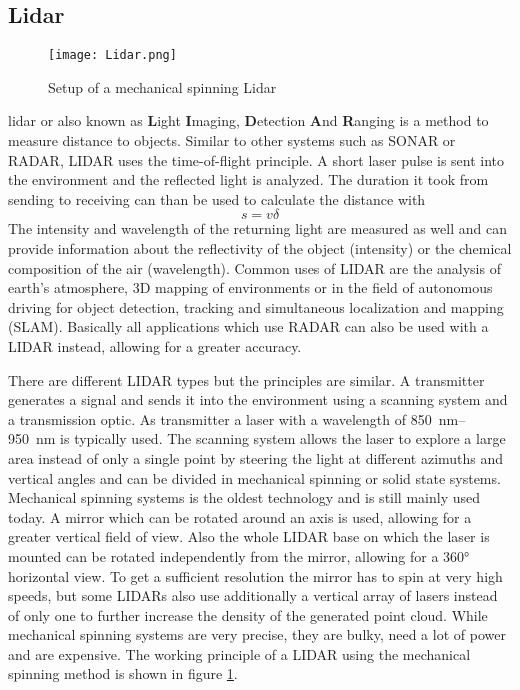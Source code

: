 \subsection{Lidar}
\begin{figure}[htb]
	\centering
	\texttt{[image: Lidar.png]}
	\caption{Setup of a mechanical spinning Lidar \cite{Li2020}}
	\label{fig:lidar}
\end{figure}
\gls{lidar} or also known as \textbf{L}ight \textbf{I}maging, \textbf{D}etection \textbf{A}nd \textbf{R}anging is a method to measure distance to objects.
Similar to other systems such as SONAR or RADAR, LIDAR uses the time-of-flight principle.
A short laser pulse is sent into the environment and the reflected light is analyzed.
The duration it took from sending to receiving can than be used to calculate the distance with 
\[ s = v\delta \]
The intensity and wavelength of the returning light are measured as well and can provide information about the reflectivity of the object (intensity) or the chemical composition of the air (wavelength).
Common uses of LIDAR are the analysis of earth's atmosphere, 3D mapping of environments or in the field of autonomous driving for object detection, tracking and simultaneous localization and mapping (SLAM).
Basically all applications which use RADAR can also be used with a LIDAR instead, allowing for a greater accuracy.

There are different LIDAR types but the principles are similar.
A transmitter generates a signal and sends it into the environment using a scanning system and a transmission optic.
As transmitter a laser with a wavelength of \SIrange{850}{950}{\nano\metre} is typically used.
The scanning system allows the laser to explore a large area instead of only a single point by steering the light at different azimuths and vertical angles and can be divided in mechanical spinning or solid state systems.
Mechanical spinning systems is the oldest technology and is still mainly used today.
A mirror which can be rotated around an axis is used, allowing for a greater vertical field of view.
Also the whole LIDAR base on which the laser is mounted can be rotated independently from the mirror, allowing for a 360° horizontal view.
To get a sufficient resolution the mirror has to spin at very high speeds, but some LIDARs also use additionally a vertical array of lasers instead of only one to further increase the density of the generated point cloud.
While mechanical spinning systems are very precise, they are bulky, need a lot of power and are expensive.
The working principle of a LIDAR using the mechanical spinning method is shown in figure \ref{fig:lidar}.

